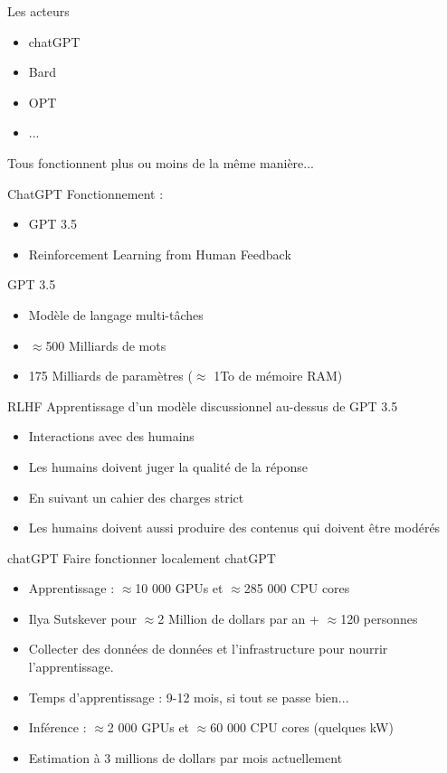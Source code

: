 \begin{frame}{Les acteurs}
  \begin{itemize}
    \item chatGPT
    \item Bard 
    \item OPT
    \item ...
  \end{itemize}
  Tous fonctionnent plus ou moins de la même manière...
\end{frame}

\begin{frame}{ChatGPT}
  Fonctionnement : 
  \begin{itemize}
    \item GPT 3.5
    \item Reinforcement Learning from Human Feedback
  \end{itemize}
\end{frame}

\begin{frame}{GPT 3.5}
  \begin{itemize}
    \item Modèle de langage multi-tâches
    \item $\approx$500 Milliards de mots
    \item 175 Milliards de paramètres ($\approx$ 1To de mémoire RAM)
  \end{itemize}
\end{frame}

\begin{frame}{RLHF}
  Apprentissage d'un modèle discussionnel au-dessus de GPT 3.5
  \begin{itemize}
    \item Interactions avec des humains
    \item Les humains doivent juger la qualité de la réponse
    \item En suivant un cahier des charges strict
    \item Les humains doivent aussi produire des contenus qui doivent être modérés
  \end{itemize}
\end{frame}

\begin{frame}{chatGPT}
  Faire fonctionner localement chatGPT
  \begin{itemize}
    \item Apprentissage : $\approx$10 000 GPUs et $\approx$285 000 CPU cores
    \item Ilya Sutskever pour $\approx$2 Million de dollars par an + $\approx$120 personnes
    \item Collecter des données de données et l'infrastructure pour nourrir l'apprentissage.
    \item Temps d'apprentissage : 9-12 mois, si tout se passe bien...
    \item Inférence : $\approx$2 000 GPUs et $\approx$60 000 CPU cores (quelques kW)
    \item Estimation à 3 millions de dollars par mois actuellement
  \end{itemize}
\end{frame}

